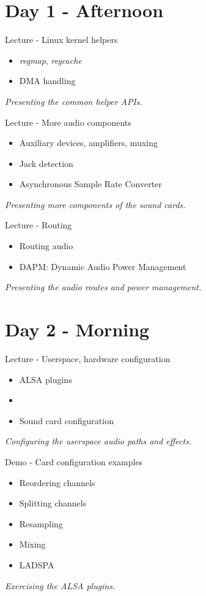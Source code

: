 \documentclass[a4paper,12pt,obeyspaces,spaces,hyphens]{article}
\begin{document}
\section{Day 1 - Afternoon}

\feagendatwocolumn
{Lecture - Linux kernel helpers}
{
  \begin{itemize}
  \item {\em regmap}, {\em regcache}
  \item DMA handling
  \end{itemize}
  \vspace{0.5em}
  {\em Presenting the common helper APIs.}
}
{Lecture - More audio components}
{
  \begin{itemize}
  \item Auxiliary devices, amplifiers, muxing
  \item Jack detection
  \item Asynchronous Sample Rate Converter
  \end{itemize}
  \vspace{0.5em}
  {\em Presenting more components of the sound cards.}
}

\feagendaonecolumn
{Lecture - Routing}
{
  \begin{itemize}
  \item Routing audio
  \item DAPM: Dynamic Audio Power Management
  \end{itemize}
  \vspace{0.5em}
  {\em Presenting the audio routes and power management.}
}

\section{Day 2 - Morning}

\feagendatwocolumn
{Lecture - Userspace, hardware configuration}
{
  \begin{itemize}
  \item ALSA plugins
  \item {}
  \item Sound card configuration
  \end{itemize}
  \vspace{0.5em}
  {\em Configuring the userspace audio paths and effects.}
}
{Demo - Card configuration examples}
{
  \begin{itemize}
  \item Reordering channels
  \item Splitting channels
  \item Resampling
  \item Mixing
  \item LADSPA
  \end{itemize}
  \vspace{0.5em}
  {\em Exercising the ALSA plugins.}
}
\end{document}
